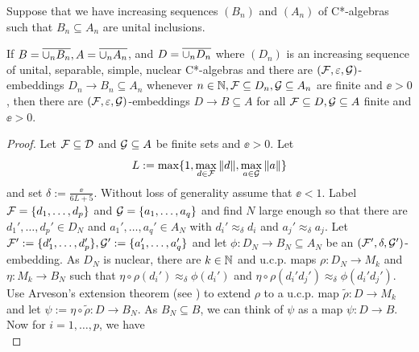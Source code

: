\documentclass[12pt]{amsart}
\begin{document}
  \begin{prop}\label{approximateembeddinginductivelimit}
      Suppose that we have increasing sequences $(B_n)$ and $(A_n)$ of C*-algebras such that $B_n \subseteq A_n$ are unital inclusions.

If $B = \overline{\cup_n B_n}, A = \overline{\cup_n A_n}$, and $D = \overline{\cup_nD_n}$ where $(D_n)$ is an increasing sequence of unital, separable, simple, nuclear C*-algebras and there are $(\mathcal{F},\varepsilon,\mathcal{G})$-embeddings $D_n \to B_n \subseteq A_n$ whenever $n \in \mathbb{N}, \mathcal{F} \subseteq D_n, \mathcal{G} \subseteq A_n$ are finite and $\ee > 0$, then there are $(\mathcal{F},\varepsilon,\mathcal{G})$-embeddings $D \to B \subseteq A$ for all $\mathcal{F} \subseteq D,\mathcal{G} \subseteq A$ finite and $\ee > 0$. 
  \begin{proof}
    Let $\mathcal{F} \subseteq \mathcal{D}$ and $\mathcal{G} \subseteq A$ be finite sets and $\ee > 0$. Let
\begin{equation}
    L := \max\{1,\max_{d \in \mathcal{F}}\|d\|,\max_{a \in \mathcal{G}}\|a\|\}
\end{equation}
     and set $\delta := \frac{\ee}{6L+5}$. Without loss of generality assume that $\ee < 1$. Label $\mathcal{F} = \{d_1,\dots,d_p\}$ and $\mathcal{G} = \{a_1,\dots,a_q\}$ and find $N$ large enough so that there are $d_1',\dots,d_p' \in D_N$ and $a_1',\dots,a_q' \in A_N$ with $d_i' \approx_\delta d_i$ and $a_j' \approx_\delta a_j$. Let $\mathcal{F}':=\{d_1',\dots,d_p'\}, \mathcal{G}':=\{a_1',\dots,a_q'\}$ and let $\phi: D_N \to B_N \subseteq A_N$ be an $(\mathcal{F}',\delta,\mathcal{G}')$-embedding. As $D_N$ is nuclear, there are $k \in \mathbb{N}$ and u.c.p. maps $\rho: D_N \to M_k$ and $\eta: M_k \to B_N$ such that $\eta \circ \rho(d_i') \approx_\delta \phi(d_i')$ and $\eta \circ \rho(d_i'd_j') \approx_\delta \phi(d_i'd_j')$. Use Arveson's extension theorem (see \cite[Section 1.6]{BrownOzawa}) to extend $\rho$ to a u.c.p. map $\tilde{\rho}: D \to M_k$ and let $\psi := \eta \circ \tilde{\rho}: D \to B_N$. As $B_N \subseteq B$, we can think of $\psi$ as a map $\psi: D \to B$. Now for $i=1,\dots,p$, we have
\begin{equation}

\end{equation}
\end{proof}
\end{prop}
\end{document}
